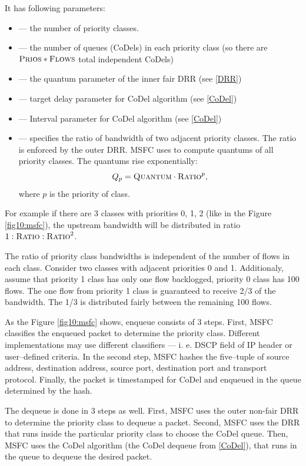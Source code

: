 It has following parameters:
\begin{itemize}
	\item {} --- the number of priority classes.
	\item {} --- the number of queues (CoDels) in each priority class (so there are $\textsc{Prios}*\textsc{Flows}$ total independent CoDels)
	\item {} --- the quantum parameter of the inner fair DRR (see \autoref{DRR})
	\item {} --- target delay parameter for CoDel algorithm (see \autoref{CoDel})
	\item {} --- Interval parameter for CoDel algorithm (see \autoref{CoDel})
	\item {} --- specifies the ratio of bandwidth of two adjacent priority classes. The ratio is enforced by the outer DRR. MSFC uses  to compute quantums of all priority classes. The quantums rise exponentially:
	\[
	Q_p = \textsc{Quantum} \cdot \textsc{Ratio}^p,
	\]
	where $p$ is the priority of class.
\end{itemize}
For example if there are 3 classes with priorities 0, 1, 2 (like in the Figure \ref{fig10:msfc}), the upstream bandwidth will be distributed in ratio $1:\textsc{Ratio}:\textsc{Ratio}^2$.

The ratio of priority class bandwidths is independent of the number of flows in each class. Consider two classes with adjacent priorities 0 and 1. Additionaly, assume that priority 1 class has only one flow backlogged, priority 0 class has 100 flows. The one flow from priority 1 class is guaranteed to receive 2/3 of the bandwidth. The 1/3 is distributed fairly between the remaining 100 flows.

As the Figure \ref{fig10:msfc} shows, enqueue consists of 3 steps. First, MSFC classifies the enqueued packet to determine the priority class. Different implementations may use different classifiers --- i. e. DSCP field of IP header or user--defined criteria. In the second step, MSFC hashes the five--tuple of source address, destination address, source port, destination port and transport protocol. Finally, the packet is timestamped for CoDel and enqueued in the queue determined by the hash.

The dequeue is done in 3 steps as well. First, MSFC uses the outer non-fair DRR to determine the priority class to dequeue a packet. Second, MSFC uses the DRR that runs inside the particular priority class to choose the CoDel queue. Then, MSFC uses the CoDel algorithm (the CoDel dequeue from \autoref{CoDel}), that runs in the queue to dequeue the desired packet.

